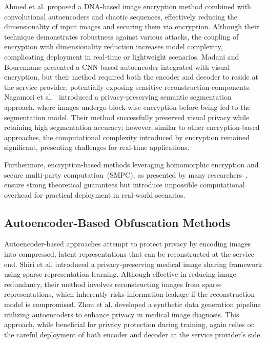 \documentclass{ieeeaccess}
\begin{document}
Ahmed et al.\cite{10.1145/3570165} proposed a DNA-based image encryption method combined with convolutional autoencoders and chaotic sequences, effectively reducing the dimensionality of input images and securing them via encryption. Although their technique demonstrates robustness against various attacks, the coupling of encryption with dimensionality reduction increases model complexity, complicating deployment in real-time or lightweight scenarios. Madani and Bourennane\cite{Madani_2025} presented a CNN-based autoencoder integrated with visual encryption, but their method required both the encoder and decoder to reside at the service provider, potentially exposing sensitive reconstruction components. Nagamori et al.~\cite{jimaging8090233} introduced a privacy-preserving semantic segmentation approach, where images undergo block-wise encryption before being fed to the segmentation model. Their method successfully preserved visual privacy while retaining high segmentation accuracy; however, similar to other encryption-based approaches, the computational complexity introduced by encryption remained significant, presenting challenges for real-time applications. 

Furthermore, encryption-based methods leveraging homomorphic encryption and secure multi-party computation~(SMPC), as presented by many researchers~\cite{9936637,9833432,Jia2023,refId0,10.1145/3676641.3716008,garimella2025helrmencrypteddeeplearning,dhyani2023privitvisiontransformersfast,luo-etal-2024-secformer}, ensure strong theoretical guarantees but introduce impossible computational overhead for practical deployment in real-world scenarios.

\subsection{Autoencoder-Based Obfuscation Methods}

Autoencoder-based approaches attempt to protect privacy by encoding images into compressed, latent representations that can be reconstructed at the service end. Shiri et al.\cite{SHIRI2024104583} introduced a privacy-preserving medical image sharing framework using sparse representation learning. Although effective in reducing image redundancy, their method involves reconstructing images from sparse representations, which inherently risks information leakage if the reconstruction model is compromised. Zhou et al.\cite{Zhou2024} developed a synthetic data generation pipeline utilizing autoencoders to enhance privacy in medical image diagnosis. This approach, while beneficial for privacy protection during training, again relies on the careful deployment of both encoder and decoder at the service provider's side.
\end{document}

